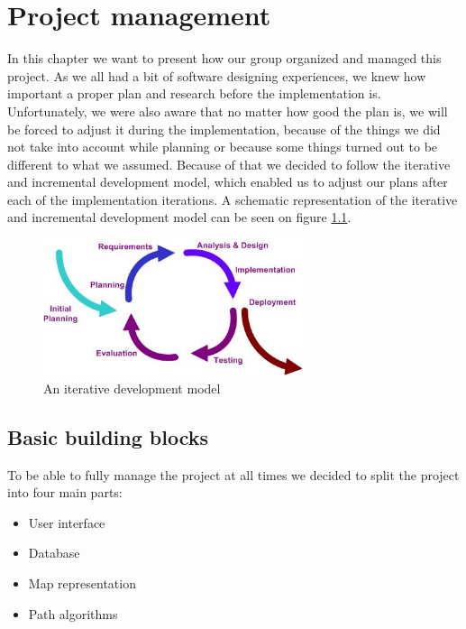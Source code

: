 \documentclass[reqno,openany,12pt]{amsbook}
\theoremstyle{definition}
\theoremstyle{remark}
\begin{document}
\chapter{Project management}
In this chapter we want to present how our group organized and managed this project. As we all had a bit of software designing experiences, we knew how important a proper plan and research before the implementation is. Unfortunately, we were also aware that no matter how good the plan is, we will be forced to adjust it during the implementation, because of the things we did not take into account while planning or because some things turned out to be different to what we assumed. Because of that we decided to follow the iterative and incremental development model, which enabled us to adjust our plans after each of the implementation iterations. A schematic representation of the iterative and incremental development model can be seen on figure \ref{fig:Iterative_development_model_V2}. 
\begin{figure}[h]
\centering
\includegraphics[height=4cm]{../photos/Iterative_development_model_V2}
\caption{An iterative development model}
\label{fig:Iterative_development_model_V2}
\end{figure}
\section{Basic building blocks}
To be able to fully manage the project at all times we decided to split the project into four main parts:
\begin{itemize}
\item User interface
\item Database
\item Map representation
\item Path algorithms
\end{itemize}
\end{document}
